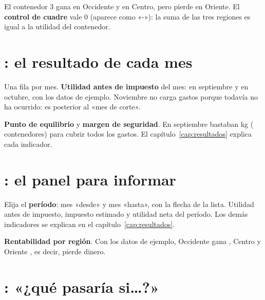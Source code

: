  El contenedor 3 gana en Occidente y en Centro, pero pierde en Oriente. El \textbf{control de cuadre} vale 0 (aparece
como «-»): la suma de las tres regiones es igual a la utilidad del contenedor.

\section{: el resultado de cada mes}

 Una fila por mes.  \textbf{Utilidad antes de impuesto} del mes: \vUAIsep{} en septiembre y \vUAIoct{} en octubre,
con los datos de ejemplo. Noviembre no carga gastos porque todavía no ha ocurrido: es posterior al «mes de corte».

 \textbf{Punto de equilibrio} y \textbf{margen de seguridad}. En septiembre bastaban \vPEsep{} kg (\vPEcontSep{} contenedores)
para cubrir todos los gastos. El capítulo~\ref{cap:resultados} explica cada indicador.

\section{: el panel para informar}

 Elija el \textbf{período}: mes «desde» y mes «hasta», con la flecha de la lista.  Utilidad antes de impuesto,
impuesto estimado y utilidad neta del período. Los demás indicadores se explican en el capítulo~\ref{cap:resultados}.

 \textbf{Rentabilidad por región}. Con los datos de ejemplo, Occidente gana \vUAIocc, Centro \vUAIcen{} y Oriente
\textcolor{red}{\vUAIori}, es decir, pierde dinero.


\section{: «¿qué pasaría si\dots?»}

